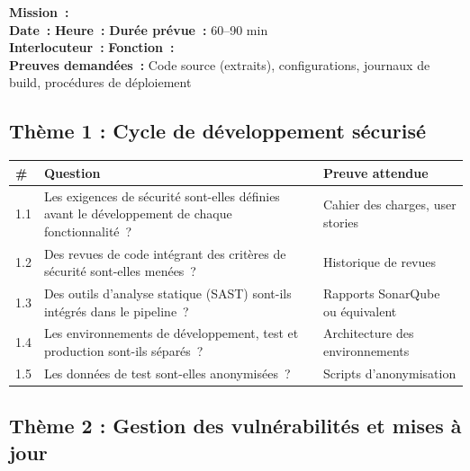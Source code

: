 \documentclass[12pt,a4paper,oneside]{report}
\begin{document}
\begin{goldbox}[title={\color{navy}\bfseries Informations g\'en\'erales}]
\small
\textbf{Mission~:} \dotfill \\[4pt]
\textbf{Date~:} \dotfill \quad \textbf{Heure~:} \dotfill \quad \textbf{Dur\'ee pr\'evue~:} 60--90 min \\[4pt]
\textbf{Interlocuteur~:} \dotfill \quad \textbf{Fonction~:} \dotfill \\[4pt]
\textbf{Preuves demand\'ees~:} Code source (extraits), configurations, journaux de build, proc\'edures de d\'eploiement
\end{goldbox}

\subsection*{Th\`eme 1 : Cycle de d\'eveloppement s\'ecuris\'e}

\begin{longtable}{|p{0.5cm}|p{8cm}|p{5cm}|}
\hline
\rowcolor{theadcolor}
\color{white}\textbf{\#} &
\color{white}\textbf{Question} &
\color{white}\textbf{Preuve attendue} \\
\hline\endhead\hline\endfoot
\rowcolor{trow1}
1.1 & Les exigences de s\'ecurit\'e sont-elles d\'efinies avant le d\'eveloppement de chaque fonctionnalit\'e~? &
  Cahier des charges, user stories \\
\hline\rowcolor{trow2}
1.2 & Des revues de code int\'egrant des crit\`eres de s\'ecurit\'e sont-elles men\'ees~? &
  Historique de revues \\
\hline\rowcolor{trow1}
1.3 & Des outils d'analyse statique (SAST) sont-ils int\'egr\'es dans le pipeline~? &
  Rapports SonarQube ou \'equivalent \\
\hline\rowcolor{trow2}
1.4 & Les environnements de d\'eveloppement, test et production sont-ils s\'epar\'es~? &
  Architecture des environnements \\
\hline\rowcolor{trow1}
1.5 & Les donn\'ees de test sont-elles anonymis\'ees~? &
  Scripts d'anonymisation \\
\hline
\end{longtable}

\subsection*{Th\`eme 2 : Gestion des vuln\'erabilit\'es et mises \`a jour}
\end{document}
